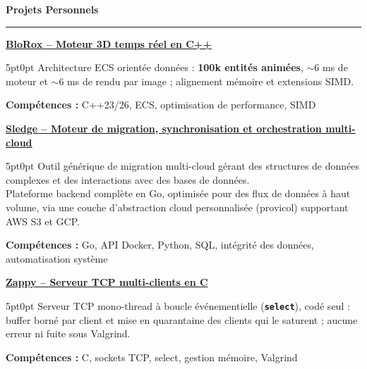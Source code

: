 \documentclass[9pt]{extarticle}
\begin{document}
{\large\bfseries Projets Personnels}
\par\vspace{-8pt}
\rule{\linewidth}{0.4pt}
\par\vspace{5pt}

\underline{\bfseries \href{https://github.com/paulogarithm/blorox}{BloRox} -- Moteur 3D temps réel en C++}
\par
\begin{adjustwidth}{5pt}{0pt}
	Architecture ECS orientée données : {\bfseries 100k entités animées}, $\sim$6 ms de moteur et $\sim$6 ms de rendu par image ; alignement mémoire et extensions SIMD.
\end{adjustwidth}
\par
{\bfseries Compétences :} C++23/26, ECS, optimisation de performance, SIMD

\par\vspace{8pt}

\underline{\bfseries Sledge -- Moteur de migration, synchronisation et orchestration multi-cloud}
\par
\begin{adjustwidth}{5pt}{0pt}
    Outil générique de migration multi-cloud gérant des structures de données complexes et des interactions avec des bases de données. \\
    Plateforme backend complète en Go, optimisée pour des flux de données à haut volume, via une couche d'abstraction cloud personnalisée ({\ttfamily provicol}) supportant AWS S3 et GCP.
\end{adjustwidth}
\par
{\bfseries Compétences :} Go, API Docker, Python, SQL, intégrité des données, automatisation système

\par\vspace{8pt}

\underline{\bfseries Zappy -- Serveur TCP multi-clients en C}
\par
\begin{adjustwidth}{5pt}{0pt}
    Serveur TCP mono-thread à boucle événementielle ({\bfseries \texttt{select}}), codé seul : buffer borné par client et mise en quarantaine des clients qui le saturent ; aucune erreur ni fuite sous Valgrind.
\end{adjustwidth}
\par
{\bfseries Compétences :} C, sockets TCP, select, gestion mémoire, Valgrind
\end{document}

